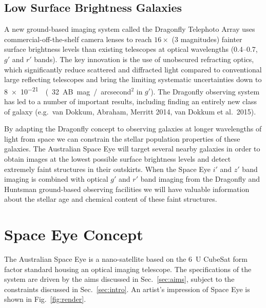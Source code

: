 \documentclass[]{iac}
\begin{document}
\subsection{Low Surface Brightness Galaxies}

A new ground-based imaging system called the Dragonfly Telephoto Array\cite{Abraham2014} uses commercial-off-the-shelf
camera lenses to reach $16\times$ (3 magnitudes) fainter surface brightness levels than existing telescopes at optical
wavelengths (0.4--\SI{0.7}{\micron}, $g'$ and $r'$ bands). The key innovation is the use of unobscured refracting
optics, which significantly reduce scattered and diffracted light compared to conventional large reflecting telescopes
and bring the limiting systematic uncertainties down to
\SI{8e-21}{\watt\per\square\meter\per\micron\per\square\tarcsecond} (32 AB mag./arcsecond$^2$ in $g'$)\cite{Sandin2014}.
The Dragonfly observing system has led to a number of important results, including finding an entirely new class of
galaxy (e.g.\ van Dokkum, Abraham, Merritt 2014\cite{VanDokkum2014}, van Dokkum et al.\ 2015\cite{VanDokkum2015}).

By adapting the Dragonfly concept to observing galaxies at longer wavelengths of light from space we can constrain the
stellar population properties of these galaxies. The Australian Space Eye will target several nearby galaxies in order
to obtain images at the lowest possible surface brightness levels and detect extremely faint structures in their
outskirts. When the Space Eye $i'$ and $z'$ band imaging is combined with optical $g'$ and $r'$ band imaging from the
Dragonfly and Huntsman\cite{Horton2016} ground-based observing facilities we will have valuable information about the
stellar age and chemical content of these faint structures.

\section{Space Eye Concept}

The Australian Space Eye is a nano-satellite based on the \SI{6}{U} CubeSat form factor standard\cite{Hevner2011}
housing an optical imaging telescope. The specifications of the system are driven by the aims discussed in
Sec.~\ref{sec:aims}, subject to the constraints discussed in Sec.~\ref{sec:intro}. An artist's impression of Space Eye
is shown in Fig.~\ref{fig:render}.
\end{document}
